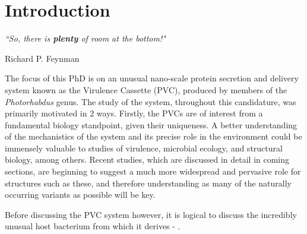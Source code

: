 \chapter{Introduction}\label{intro}

\pagestyle{IHA-fancy-style}


\epigraph{\textit{``So, there is \textbf{plenty} of room at the bottom!"}}{Richard P. Feynman}

The focus of this PhD is on an unusual nano-scale protein secretion and delivery system known as the \Pa{} Virulence Cassette (PVC), produced by members of the \emph{Photorhabdus} genus. The study of the system, throughout this candidature, was primarily motivated in 2 ways. Firstly, the PVCs are of interest from a fundamental biology standpoint, given their uniqueness. A better understanding of the mechanistics of the system and its precise role in the environment could be immensely valuable to studies of virulence, microbial ecology, and structural biology, among others. Recent studies, which are discussed in detail in coming sections, are beginning to suggest a much more widespread and pervasive role for structures such as these, and therefore understanding as many of the naturally occurring variants as possible will be key. 



Before discussing the PVC system however, it is logical to discuss the incredibly unusual host bacterium from which it derives - \Pa.

\section{\Pa}

